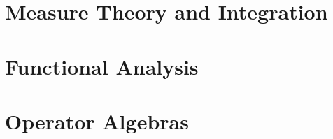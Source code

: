 \documentclass[11pt]{package2}
\begin{document}
\chapter{Measure Theory and Integration}\label{ch:measure_theory}

\chapter{Functional Analysis}\label{ch:functional_analysis}

\chapter{Operator Algebras}\label{ch:operator_algebras}

\nocite{*}
\printbibliography[heading=bibintoc,title={References}]
\end{document}
